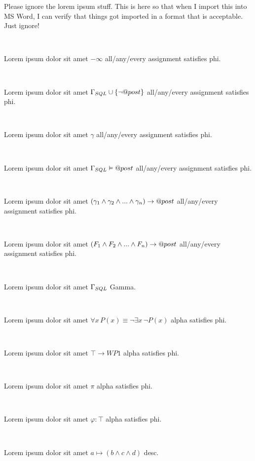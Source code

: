 \documentclass[12pt]{article}
\begin{document}
Please ignore the lorem ipsum stuff. This is here so that when I import this into MS Word, I can verify that things got imported in a format that is acceptable.  Just ignore!

\centerline{~}

Lorem ipsum dolor sit amet $ - \infty $ all/any/every assignment satisfies phi.

\centerline{~}

Lorem ipsum dolor sit amet $ \Gamma_{\scriptsize SQL} \cup \{\neg @post\} $ all/any/every assignment satisfies phi.

\centerline{~}

Lorem ipsum dolor sit amet $ \gamma $ all/any/every assignment satisfies phi.

\centerline{~}

Lorem ipsum dolor sit amet $ \Gamma_{\scriptsize SQL} \vDash @post $ all/any/every assignment satisfies phi.

\centerline{~}

Lorem ipsum dolor sit amet $ ( \gamma_{\scriptsize 1} \wedge \gamma_{\scriptsize 2} \wedge ... \wedge \gamma_{\scriptsize n} ) \rightarrow @post $ all/any/every assignment satisfies phi.

\centerline{~}

Lorem ipsum dolor sit amet $ ( F_{\scriptsize 1} \wedge F_{\scriptsize 2} \wedge ... \wedge F_{\scriptsize n} ) \rightarrow @post $ all/any/every assignment satisfies phi.

\centerline{~}

Lorem ipsum dolor sit amet $ \Gamma_{\scriptsize SQL} $ Gamma.

\centerline{~}

Lorem ipsum dolor sit amet $ \forall x \, P(x) \equiv \neg \exists x \, \neg P(x)  $ alpha satisfies phi.

\centerline{~}

Lorem ipsum dolor sit amet $ \top \rightarrow WP1 $ alpha satisfies phi.

\centerline{~}

Lorem ipsum dolor sit amet $ \pi $ alpha satisfies phi.

\centerline{~}

Lorem ipsum dolor sit amet $ \varphi : \top $ alpha satisfies phi.

\centerline{~}

Lorem ipsum dolor sit amet $ a \mapsto ( b \wedge c \wedge d )  $ desc.

\centerline{~}
\end{document}
